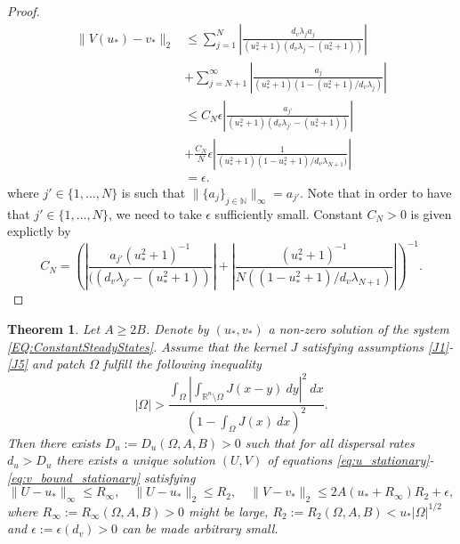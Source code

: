 \documentclass[12pt, a4paper]{article}
\theoremstyle{break}
\newtheorem{thm}{Theorem}[section]
\theoremstyle{break}
\theoremstyle{break}
\theoremstyle{break}
\theoremstyle{break}
\theoremstyle{break}
\theoremstyle{break}
\begin{document}
\begin{proof}
    \begin{align*}
        \|V(u_*) - v_*\|_2
        &\leq
        \sum_{j=1}^N\left| \frac{d_v \lambda_j a_j}{(u_*^2+1)(d_v\lambda_j - (u_*^2+1))} \right| \\
        &+
        \sum_{j=N+1}^\infty\left| \frac{a_j}{(u_*^2+1)(1 - (u_*^2+1) / d_v \lambda_j)} \right| \\
        &\leq
        C_N \epsilon \left| \frac{a_{j'}}{(u_*^2+1)(d_v\lambda_{j'} - (u_*^2+1))} \right| \\
        &+
        \frac{C_N}{N} \epsilon \left| \frac{1}{(u_*^2+1)(1 - u_*^2+1) / d_v \lambda_{N+1})} \right| \\
        &= \epsilon.
    \end{align*}
    where $j' \in \{1, \ldots, N\}$ is such that $\|\{a_j\}_{j \in \mathbb{N}}\|_\infty = a_{j'}$. Note that in order to have that $j' \in \{1, \ldots, N\}$, we need to take $\epsilon$ sufficiently small. Constant $C_N > 0$ is given explictly by
    \begin{equation*}
        C_N = \left( \left| \frac{a_{j'}(u_*^2+1)^{-1}}{((d_v\lambda_{j'} - (u_*^2+1))} \right| + \left| \frac{(u_*^2+1)^{-1}}{N((1 - u_*^2+1) / d_v \lambda_{N+1})} \right| \right)^{-1}.
    \end{equation*}
\end{proof}

\begin{thm}
    \label{thm:Stationary-Solutions-Existence}
    Let $A \geq 2B$. Denote by $(u_*, v_*)$ a non-zero solution of the system \eqref{EQ:ConstantSteadyStates}. Assume that the kernel $J$ satisfying assumptions \ref{J1}-\ref{J5} and patch $\Omega$ fulfill the following inequality
    \begin{equation}
        |\Omega| > \frac{\int_\Omega\left|\int_{\mathbb{R}^n\setminus\Omega} J(x-y)\:dy \right|^2\:dx}{\left(1 - \int_\Omega J(x)\:dx\right)^2}.
    \end{equation}
    Then there exists $D_u := D_u(\Omega, A, B) > 0$ such that for all dispersal rates $d_u > D_u$ there exists a unique solution $(U, V)$ of equations \eqref{eq:u_stationary}-\eqref{eq:v_bound_stationary} satisfying
    \begin{equation}
        \|U - u_*\|_\infty \leq R_\infty, \quad \|U - u_*\|_2 \leq R_2, \quad \|V - v_*\|_2 \leq 2A(u_* + R_\infty) R_2 + \epsilon,
    \end{equation}
    where $R_\infty := R_\infty(\Omega, A, B) > 0$ might be large, $R_2 := R_2(\Omega, A, B) < u_* |\Omega|^{1/2}$ and $\epsilon := \epsilon(d_v) > 0$ can be made arbitrary small.
\end{thm}
\end{document}
